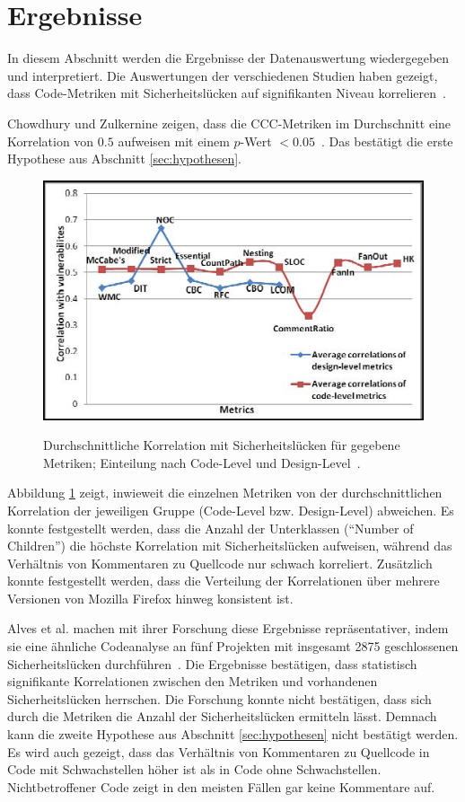 \section{Ergebnisse}
\label{sec:ergebnisse}
In diesem Abschnitt werden die Ergebnisse der Datenauswertung wiedergegeben und interpretiert.
Die Auswertungen der verschiedenen Studien haben gezeigt, dass Code-Metriken mit Sicherheitslücken auf signifikanten Niveau korrelieren~\cite{chowdhury_zulkernine_2010,chowdhury_zulkernine_2009,alves_et_al}.

Chowdhury und Zulkernine zeigen, dass die CCC-Metriken im Durchschnitt eine Korrelation von $0.5$ aufweisen mit einem $p$-Wert $< 0.05$~\cite{chowdhury_zulkernine_2010}.
Das bestätigt die erste Hypothese aus Abschnitt \ref{sec:hypothesen}.
\begin{figure}
	\includegraphics[width=\textwidth]{img/code_vs_design.png}
	\label{fig:code_vs_design}
	\caption{Durchschnittliche Korrelation mit Sicherheitslücken für gegebene Metriken; Einteilung nach Code-Level und Design-Level~\cite{chowdhury_zulkernine_2010}.}
\end{figure}
Abbildung \ref{fig:code_vs_design} zeigt, inwieweit die einzelnen Metriken von der durchschnittlichen Korrelation der jeweiligen Gruppe (Code-Level bzw. Design-Level) abweichen.
Es konnte festgestellt werden, dass die Anzahl der Unterklassen ("`Number of Children"') die höchste Korrelation mit Sicherheitslücken aufweisen, während das Verhältnis von Kommentaren zu Quellcode nur schwach korreliert.
Zusätzlich konnte festgestellt werden, dass die Verteilung der Korrelationen über mehrere Versionen von Mozilla Firefox hinweg konsistent ist.

Alves et al. machen mit ihrer Forschung diese Ergebnisse repräsentativer, indem sie eine ähnliche Codeanalyse an fünf Projekten mit insgesamt 2875 geschlossenen Sicherheitslücken durchführen~\cite{alves_et_al}.
Die Ergebnisse bestätigen, dass statistisch signifikante Korrelationen zwischen den Metriken und vorhandenen Sicherheitslücken herrschen.
Die Forschung konnte nicht bestätigen, dass sich durch die Metriken die Anzahl der Sicherheitslücken ermitteln lässt.
Demnach kann die zweite Hypothese aus Abschnitt \ref{sec:hypothesen} nicht bestätigt werden.
Es wird auch gezeigt, dass das Verhältnis von Kommentaren zu Quellcode in Code mit Schwachstellen höher ist als in Code ohne Schwachstellen.
Nichtbetroffener Code zeigt in den meisten Fällen gar keine Kommentare auf.

